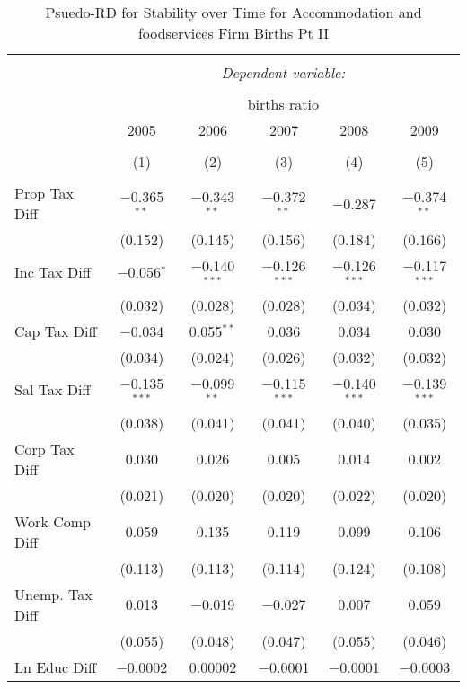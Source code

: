 
\begin{table}[!htbp] \centering 
  \caption{Psuedo-RD for Stability over Time for  Accommodation and foodservices Firm Births Pt II} 
  \label{72year} 
\small 
\begin{tabular}{@{\extracolsep{5pt}}lccccc} 
\\[-1.8ex]\hline 
\hline \\[-1.8ex] 
 & \multicolumn{5}{c}{\textit{Dependent variable:}} \\ 
\cline{2-6} 
\\[-1.8ex] & \multicolumn{5}{c}{births ratio} \\ 
 & 2005 & 2006 & 2007 & 2008 & 2009 \\ 
\\[-1.8ex] & (1) & (2) & (3) & (4) & (5)\\ 
\hline \\[-1.8ex] 
 Prop Tax Diff & $-$0.365$^{**}$ & $-$0.343$^{**}$ & $-$0.372$^{**}$ & $-$0.287 & $-$0.374$^{**}$ \\ 
  & (0.152) & (0.145) & (0.156) & (0.184) & (0.166) \\ 
  Inc Tax Diff & $-$0.056$^{*}$ & $-$0.140$^{***}$ & $-$0.126$^{***}$ & $-$0.126$^{***}$ & $-$0.117$^{***}$ \\ 
  & (0.032) & (0.028) & (0.028) & (0.034) & (0.032) \\ 
  Cap Tax Diff & $-$0.034 & 0.055$^{**}$ & 0.036 & 0.034 & 0.030 \\ 
  & (0.034) & (0.024) & (0.026) & (0.032) & (0.032) \\ 
  Sal Tax Diff & $-$0.135$^{***}$ & $-$0.099$^{**}$ & $-$0.115$^{***}$ & $-$0.140$^{***}$ & $-$0.139$^{***}$ \\ 
  & (0.038) & (0.041) & (0.041) & (0.040) & (0.035) \\ 
  Corp Tax Diff & 0.030 & 0.026 & 0.005 & 0.014 & 0.002 \\ 
  & (0.021) & (0.020) & (0.020) & (0.022) & (0.020) \\ 
  Work Comp Diff & 0.059 & 0.135 & 0.119 & 0.099 & 0.106 \\ 
  & (0.113) & (0.113) & (0.114) & (0.124) & (0.108) \\ 
  Unemp. Tax Diff & 0.013 & $-$0.019 & $-$0.027 & 0.007 & 0.059 \\ 
  & (0.055) & (0.048) & (0.047) & (0.055) & (0.046) \\ 
  Ln Educ Diff & $-$0.0002 & 0.00002 & $-$0.0001 & $-$0.0001 & $-$0.0003 \\ 

\end{tabular}
\end{table}
